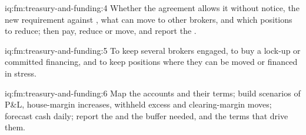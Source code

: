 \begin{solution}{iq:fm:treasury-and-funding:4}
Whether the agreement allows it without notice, the new requirement against , what can move to other brokers, and which positions
to reduce; then pay, reduce or move, and report the .
\end{solution}

\begin{solution}{iq:fm:treasury-and-funding:5}
To keep several brokers engaged, to buy a lock-up or committed financing, and to keep positions where they can be moved or financed in stress.
\end{solution}

\begin{solution}{iq:fm:treasury-and-funding:6}
Map the accounts and their terms; build scenarios of P\&L, house-margin increases, withheld excess and clearing-margin moves; forecast cash daily;
report the  and the buffer needed, and the terms that drive them.
\end{solution}
